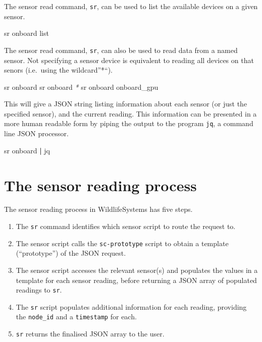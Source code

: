 \documentclass[
]{book}
\newenvironment{Shaded}{\begin{snugshade}}{\end{snugshade}}
\newcommand{\ExtensionTok}[1]{#1}
\newcommand{\KeywordTok}[1]{\textcolor[rgb]{0.13,0.29,0.53}{\textbf{#1}}}
\newcommand{\NormalTok}[1]{#1}
\newcommand{\PreprocessorTok}[1]{\textcolor[rgb]{0.56,0.35,0.01}{\textit{#1}}}
\begin{document}
The sensor read command, \texttt{sr}, can be used to list the available devices on a given sensor.

\begin{Shaded}
\begin{Highlighting}[]
\ExtensionTok{sr}\NormalTok{ onboard list}
\end{Highlighting}
\end{Shaded}

The sensor read command, \texttt{sr}, can also be used to read data from a named sensor. Not specifying a sensor device is equivalent to reading all devices on that senors (i.e.~using the wildcard''*``).

\begin{Shaded}
\begin{Highlighting}[]
\ExtensionTok{sr}\NormalTok{ onboard}
\ExtensionTok{sr}\NormalTok{ onboard }\PreprocessorTok{*}
\ExtensionTok{sr}\NormalTok{ onboard onboard\_gpu}
\end{Highlighting}
\end{Shaded}

This will give a JSON string listing information about each sensor (or just the specified sensor), and the current reading. This information can be presented in a more human readable form by piping the output to the program \texttt{jq}, a command line JSON processor.

\begin{Shaded}
\begin{Highlighting}[]
\ExtensionTok{sr}\NormalTok{ onboard }\KeywordTok{|} \ExtensionTok{jq}
\end{Highlighting}
\end{Shaded}

\hypertarget{the-sensor-reading-process}{%
\section{The sensor reading process}\label{the-sensor-reading-process}}

The sensor reading process in WildlifeSystems has five steps.

\begin{enumerate}
\def\labelenumi{\arabic{enumi}.}
\item
  The \texttt{sr} command identifies which sensor script to route the request to.
\item
  The sensor script calls the \texttt{sc-prototype} script to obtain a template (``prototype'') of the JSON request.
\item
  The sensor script accesses the relevant sensor(s) and populates the values in a template for each sensor reading, before returning a JSON array of populated readings to \texttt{sr}.
\item
  The \texttt{sr} script populates additional information for each reading, providing the \texttt{node\_id} and a \texttt{timestamp} for each.
\item
  \texttt{sr} returns the finalised JSON array to the user.
\end{enumerate}
\end{document}
